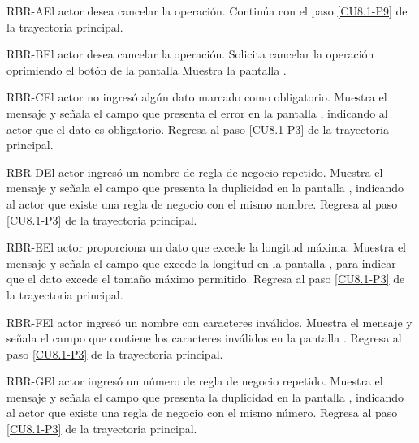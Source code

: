 	\begin{UCtrayectoriaA}{RBR-A}{El actor desea cancelar la operación.}
		\UCpaso[\UCactor] Continúa con el paso \ref{CU8.1-P9} de la trayectoria principal.
	\end{UCtrayectoriaA}
	
	
	\begin{UCtrayectoriaA}{RBR-B}{El actor desea cancelar la operación.}
		\UCpaso[\UCactor] Solicita cancelar la operación oprimiendo el botón  de la pantalla 
		\UCpaso[\UCsist] Muestra la pantalla .
	\end{UCtrayectoriaA}

	\begin{UCtrayectoriaA}{RBR-C}{El actor no ingresó algún dato marcado como obligatorio.}
		\UCpaso[\UCsist] Muestra el mensaje  y señala el campo que presenta el error en la pantalla , indicando al actor que el dato es obligatorio.
		\UCpaso Regresa al paso \ref{CU8.1-P3} de la trayectoria principal.
	\end{UCtrayectoriaA}
	
	\begin{UCtrayectoriaA}{RBR-D}{El actor ingresó un nombre de regla de negocio repetido.}
		\UCpaso[\UCsist] Muestra el mensaje  y señala el campo que presenta la duplicidad en la pantalla , indicando al actor que existe una regla de negocio con el mismo nombre.
		\UCpaso Regresa al paso \ref{CU8.1-P3} de la trayectoria principal.
	\end{UCtrayectoriaA}

	\begin{UCtrayectoriaA}{RBR-E}{El actor proporciona un dato que excede la longitud máxima.}
		\UCpaso[\UCsist] Muestra el mensaje  y señala el campo que excede la longitud en la pantalla , para indicar que el dato excede el tamaño máximo permitido.
		\UCpaso Regresa al paso \ref{CU8.1-P3} de la trayectoria principal.
	\end{UCtrayectoriaA}

	\begin{UCtrayectoriaA}{RBR-F}{El actor ingresó un nombre con caracteres inválidos.}
	\UCpaso[\UCsist] Muestra el mensaje  y señala el campo que contiene los caracteres inválidos en la pantalla .
	\UCpaso Regresa al paso \ref{CU8.1-P3} de la trayectoria principal.
	\end{UCtrayectoriaA}

	\begin{UCtrayectoriaA}{RBR-G}{El actor ingresó un número de regla de negocio repetido.}
	\UCpaso[\UCsist] Muestra el mensaje  y señala el campo que presenta la duplicidad en
	la pantalla , indicando al actor que existe una regla de negocio con el mismo número.
	\UCpaso Regresa al paso \ref{CU8.1-P3} de la trayectoria principal.
	\end{UCtrayectoriaA}

